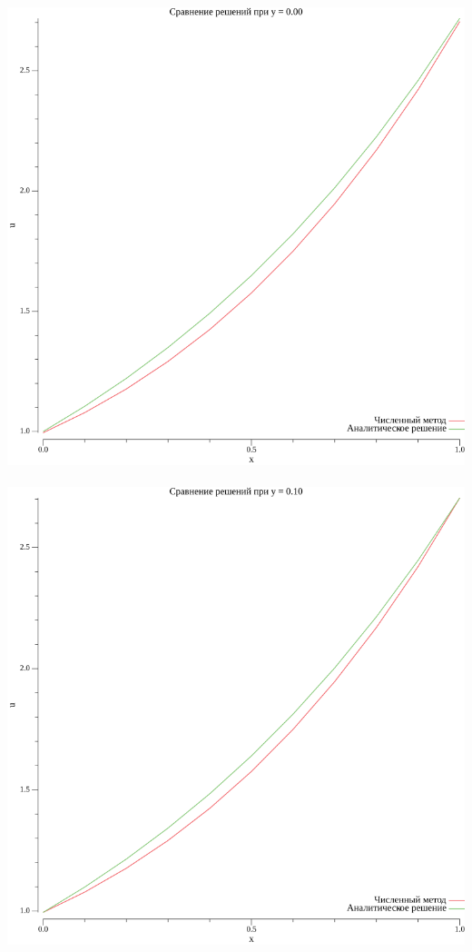 \documentclass{article}
\begin{document}
\\
\includegraphics[scale=0.6]{1plot_y_0.00.png}
\\

\\
\includegraphics[scale=0.6]{1plot_y_0.10.png}
\\
\end{document}
